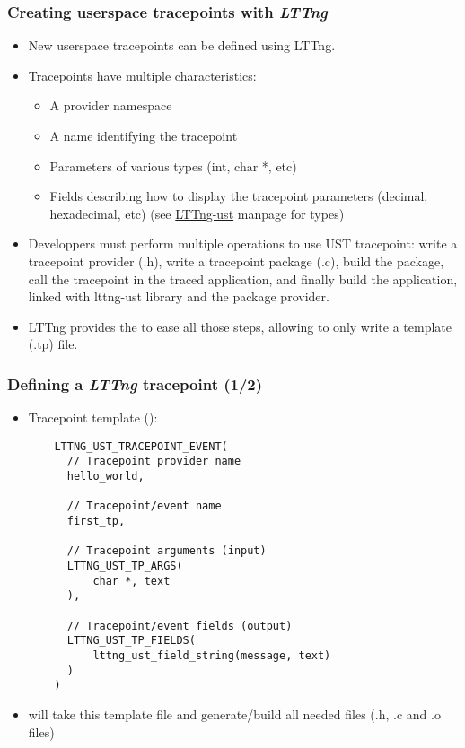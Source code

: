 \begin{frame}
  \frametitle{Creating userspace tracepoints with {\em LTTng}}
  \begin{itemize}
    \item New userspace tracepoints can be defined using LTTng.
    \item Tracepoints have multiple characteristics:
    \begin{itemize}
      \item A provider namespace
      \item A name identifying the tracepoint
      \item Parameters of various types (int, char *, etc)
      \item Fields describing how to display the tracepoint parameters
            (decimal, hexadecimal, etc) (see \href{https://lttng.org/man/3/lttng-ust/v2.13/}{LTTng-ust} manpage
            for types)
    \end{itemize}
    \item Developpers must perform multiple operations to use UST tracepoint:
    write a tracepoint provider (.h), write a tracepoint package (.c), build
    the package, call the tracepoint in the traced application, and finally
    build the application, linked with lttng-ust library and the package provider.
    \item LTTng provides the  to ease all those steps,
    allowing to only write a template (.tp) file.
  \end{itemize}
\end{frame}

\begin{frame}[fragile]
  \frametitle{Defining a {\em LTTng} tracepoint (1/2)}

  \begin{itemize}
    \item Tracepoint template ():
    \begin{block}{}
      \begin{verbatim}
    LTTNG_UST_TRACEPOINT_EVENT(
      // Tracepoint provider name
      hello_world,

      // Tracepoint/event name
      first_tp,

      // Tracepoint arguments (input)
      LTTNG_UST_TP_ARGS(
          char *, text
      ),

      // Tracepoint/event fields (output)
      LTTNG_UST_TP_FIELDS(
          lttng_ust_field_string(message, text)
      )
    )
     \end{verbatim}
    \end{block}
    \item {} will take this template file and generate/build
    all needed files (.h, .c and .o files)
  \end{itemize}
\end{frame}

